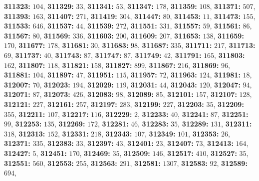 \textsf{\bfseries 311323:} $104$, \textsf{\bfseries 311329:} $33$, \textsf{\bfseries 311341:} $53$, \textsf{\bfseries 311347:} $178$, \textsf{\bfseries 311359:} $108$, \textsf{\bfseries 311371:} $507$, \textsf{\bfseries 311393:} $163$, \textsf{\bfseries 311407:} $271$, \textsf{\bfseries 311419:} $304$, \textsf{\bfseries 311447:} $80$, \textsf{\bfseries 311453:} $11$, \textsf{\bfseries 311473:} $155$, \textsf{\bfseries 311533:} $646$, \textsf{\bfseries 311537:} $44$, \textsf{\bfseries 311539:} $272$, \textsf{\bfseries 311551:} $331$, \textsf{\bfseries 311557:} $59$, \textsf{\bfseries 311561:} $86$, \textsf{\bfseries 311567:} $80$, \textsf{\bfseries 311569:} $336$, \textsf{\bfseries 311603:} $200$, \textsf{\bfseries 311609:} $207$, \textsf{\bfseries 311653:} $138$, \textsf{\bfseries 311659:} $170$, \textsf{\bfseries 311677:} $178$, \textsf{\bfseries 311681:} $30$, \textsf{\bfseries 311683:} $98$, \textsf{\bfseries 311687:} $335$, \textsf{\bfseries 311711:} $217$, \textsf{\bfseries 311713:} $69$, \textsf{\bfseries 311737:} $40$, \textsf{\bfseries 311743:} $87$, \textsf{\bfseries 311747:} $87$, \textsf{\bfseries 311749:} $42$, \textsf{\bfseries 311791:} $165$, \textsf{\bfseries 311803:} $162$, \textsf{\bfseries 311807:} $118$, \textsf{\bfseries 311821:} $158$, \textsf{\bfseries 311827:} $899$, \textsf{\bfseries 311867:} $216$, \textsf{\bfseries 311869:} $96$, \textsf{\bfseries 311881:} $104$, \textsf{\bfseries 311897:} $47$, \textsf{\bfseries 311951:} $115$, \textsf{\bfseries 311957:} $72$, \textsf{\bfseries 311963:} $124$, \textsf{\bfseries 311981:} $18$, \textsf{\bfseries 312007:} $70$, \textsf{\bfseries 312023:} $194$, \textsf{\bfseries 312029:} $119$, \textsf{\bfseries 312031:} $44$, \textsf{\bfseries 312043:} $120$, \textsf{\bfseries 312047:} $94$, \textsf{\bfseries 312071:} $87$, \textsf{\bfseries 312073:} $426$, \textsf{\bfseries 312083:} $98$, \textsf{\bfseries 312089:} $85$, \textsf{\bfseries 312101:} $157$, \textsf{\bfseries 312107:} $128$, \textsf{\bfseries 312121:} $227$, \textsf{\bfseries 312161:} $257$, \textsf{\bfseries 312197:} $283$, \textsf{\bfseries 312199:} $227$, \textsf{\bfseries 312203:} $35$, \textsf{\bfseries 312209:} $355$, \textsf{\bfseries 312211:} $107$, \textsf{\bfseries 312217:} $116$, \textsf{\bfseries 312229:} $2$, \textsf{\bfseries 312233:} $40$, \textsf{\bfseries 312241:} $87$, \textsf{\bfseries 312251:} $99$, \textsf{\bfseries 312253:} $135$, \textsf{\bfseries 312269:} $172$, \textsf{\bfseries 312281:} $46$, \textsf{\bfseries 312283:} $35$, \textsf{\bfseries 312289:} $131$, \textsf{\bfseries 312311:} $318$, \textsf{\bfseries 312313:} $152$, \textsf{\bfseries 312331:} $218$, \textsf{\bfseries 312343:} $107$, \textsf{\bfseries 312349:} $101$, \textsf{\bfseries 312353:} $26$, \textsf{\bfseries 312371:} $335$, \textsf{\bfseries 312383:} $33$, \textsf{\bfseries 312397:} $43$, \textsf{\bfseries 312401:} $23$, \textsf{\bfseries 312407:} $73$, \textsf{\bfseries 312413:} $164$, \textsf{\bfseries 312427:} $5$, \textsf{\bfseries 312451:} $170$, \textsf{\bfseries 312469:} $35$, \textsf{\bfseries 312509:} $146$, \textsf{\bfseries 312517:} $410$, \textsf{\bfseries 312527:} $35$, \textsf{\bfseries 312551:} $560$, \textsf{\bfseries 312553:} $255$, \textsf{\bfseries 312563:} $291$, \textsf{\bfseries 312581:} $1307$, \textsf{\bfseries 312583:} $92$, \textsf{\bfseries 312589:} $694$, 
